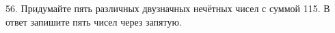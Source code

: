56. Придумайте пять различных двузначных нечётных чисел с суммой 115. В ответ запишите пять чисел через запятую.\\
